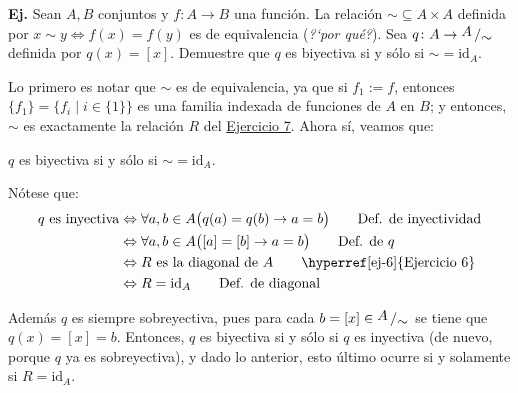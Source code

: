 \documentclass[letterpaper,DIV=14,headsepline,12pt]{scrartcl}
\makeatletter
\providecommand\st{\;|\;}
\newcounter{Ejer}
\newcommand{\pts}{}
\newenvironment{ejercicio}[1]{\noindent
    \ifthenelse{\equal{#1}{1} \OR \equal{#1}{+1}}{\renewcommand{\pts}{\textbf{(#1 pt)}}}{\renewcommand{\pts}{\textbf{(#1 pts)}}}\textbf{Ej. \theEjer} \pts\stepcounter{Ejer}}{\vspace{.3cm}}
\renewenvironment{proof}[1][]{%
        \par\pushQED{\qed}%
        \normalfont\topsep6pt \partopsep0pt %
        \trivlist
        \item[\hskip\labelsep
                \textbf{\textit{Demostración.}}%
        ]#1
        }{%
        \popQED\endtrivlist\@endpefalse
    }
\newcommand{\id}{\mathrm{id}}
\newcommand{\quot}[2]{{\raisebox{.2em}{$#1$}\left/\raisebox{-.2em}{$#2$}\right.}}
\makeatother
\begin{document}
    \begin{ejercicio}{1}
        Sean $A,B$ conjuntos y $f\colon A \to B$ una función. La relación 
        ${\sim}\subseteq A \times A$ definida por 
        $x \sim y \iff f(x)=f(y)$ es de equivalencia (\textit{?`por qué?}). Sea 
        $q\colon A \to\quot{A}{\sim}$ definida por $q(x) = [x]$. Demuestre que $q$ es
        biyectiva si y sólo si $\sim =\id_A$.
    \end{ejercicio}
    \begin{proof}
        Lo primero es notar que $\sim$ es de equivalencia, ya que si $f_1:=f$, entonces $\{f_1\}=\{f_i \st i\in \{1\}\}$ es una familia indexada de funciones de $A$ en $B$; y entonces, $\sim$ es exactamente la relación $R$ del \hyperref[ej-7]{Ejercicio 7}. Ahora sí, veamos que:
        \begin{center}
            $q$ es biyectiva si y sólo si $\sim =\id_A$.
        \end{center}

        Nótese que:
        \begin{align*}
            q \text{ es inyectiva} & \Leftrightarrow \forall a,b \in A \big( q(a)=q(b) \to a=b \big) \tag*{Def. de inyectividad} \\
            & \Leftrightarrow \forall a,b \in A \big( [a]=[b] \to a=b \big) \tag*{Def. de $q$} \\
            & \Leftrightarrow R \text{ es la diagonal de } A \tag*{\hyperref[ej-6]{Ejercicio 6}} \\
            & \Leftrightarrow R = \id_A \tag*{Def. de diagonal}
        \end{align*}

        Además $q$ es siempre sobreyectiva, pues para cada $b=[x] \in \quot{A}{\sim}$ se tiene que $q(x)=[x]=b$. Entonces, $q$ es biyectiva si y sólo si $q$ es inyectiva (de nuevo, porque $q$ ya es sobreyectiva), y dado lo anterior, esto último ocurre si y solamente si $R = \id_A$. \QED
    \end{proof}
\end{document}
